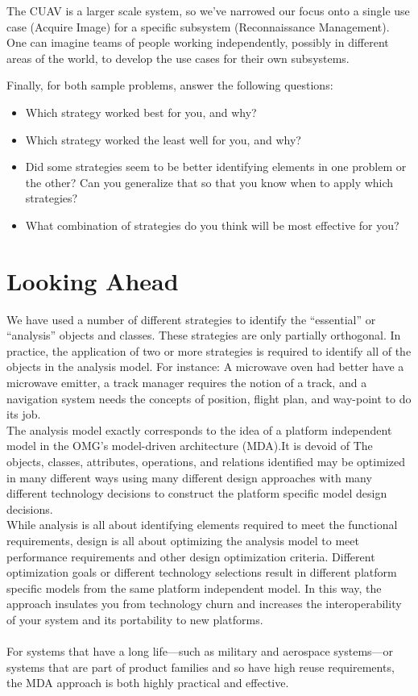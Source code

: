 \documentclass[12pt,a4paper]{article}
\begin{document}
The CUAV is a larger scale system, so we’ve narrowed our focus onto a single use case (Acquire Image) for a specific subsystem (Reconnaissance Management). One can imagine teams of people working independently, possibly in different areas of
the world, to develop the use cases for their own subsystems.

Finally, for both sample problems, answer the following questions:
\begin{itemize}
\item Which strategy worked best for you, and why?
\item Which strategy worked the least well for you, and why?
\item Did some strategies seem to be better identifying elements in one problem or the
other? Can you generalize that so that you know when to apply which strategies?
\item What combination of strategies do you think will be most effective for you?
\end{itemize}

\section{Looking Ahead}
We have used a number of different strategies to identify the “essential” or “analysis” objects and classes. These strategies are only partially orthogonal. In practice, the application of two or more strategies is required to identify all of the objects in the analysis model. For instance: A microwave oven had better have a microwave emitter, a track manager requires the notion of a track, and a navigation system needs the concepts of position, flight plan, and way-point to do its job.\\

The analysis model exactly corresponds to the idea of a platform independent model in the OMG’s model-driven architecture (MDA).It is devoid of The objects, classes, attributes, operations,
and relations identified may be optimized in many different ways using many different
design approaches with many different technology decisions to construct the
platform specific model design decisions. \\ 

While analysis is all about identifying elements required to meet the functional requirements, design is all about optimizing the analysis model to meet performance requirements and other design optimization criteria. Different optimization goals
or different technology selections result in different platform specific models from the same platform independent model. In this
way, the approach insulates you from technology churn and increases the interoperability of your system and its portability to new platforms. 
\\ \\
For systems that have a long life—such as military and aerospace systems—or systems that are part of product families and so have high reuse requirements, the MDA approach is both highly practical and effective.
\end{document}
